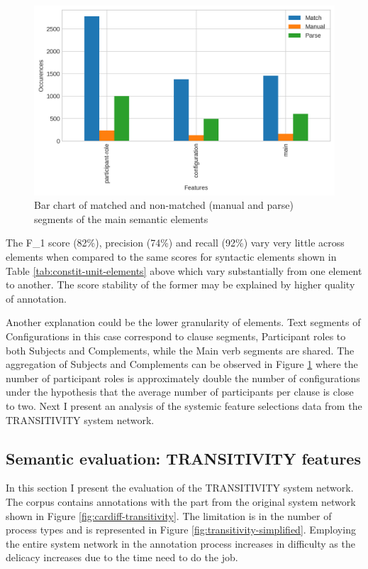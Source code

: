     \begin{figure}[!ht]
        \centering
        \includegraphics[width=.65\textwidth]{evaluation-results/figures/accuracy-semantic-figure-elements}
        \caption{Bar chart of matched and non-matched (manual and parse) segments of the main semantic elements}
        \label{fig:configuration-elements}
    \end{figure}

    The F_1 score (82\%), precision (74\%) and recall (92\%) vary very little across elements when compared to the same scores for syntactic elements shown in Table \ref{tab:constit-unit-elements} above which vary substantially from one element to another. The score stability of the former may be explained by higher quality of annotation. 

    Another explanation could be the lower granularity of elements. Text segments of Configurations in this case correspond to clause segments, Participant roles to both Subjects and Complements, while the Main verb segments are shared. The aggregation of Subjects and Complements can be observed in Figure \ref{fig:configuration-elements} where the number of participant roles is approximately double the number of configurations under the hypothesis that the average number of participants per clause is close to two. Next I present an analysis of the systemic feature selections data from the TRANSITIVITY system network. 

\subsection{Semantic evaluation: TRANSITIVITY features}
\label{sec:semantic-features}
    In this section I present the evaluation of the TRANSITIVITY system network. The corpus contains annotations with the part from the original system network shown in Figure \ref{fig:cardiff-transitivity}. The limitation is in the number of process types and is represented in Figure \ref{fig:transitivity-simplified}. Employing the entire system network in the annotation process increases in difficulty as the delicacy increases due to the time need to do the job. 

